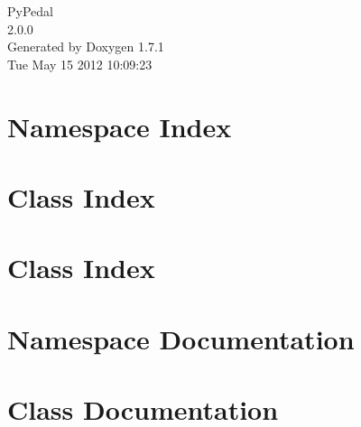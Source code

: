 \documentclass[letterpaper]{book}
\begin{document}
\hypersetup{pageanchor=false}
\begin{titlepage}
\vspace*{7cm}
\begin{center}
{\Large PyPedal \\[1ex]\large 2.0.0 }\\
\vspace*{1cm}
{\large Generated by Doxygen 1.7.1}\\
\vspace*{0.5cm}
{\small Tue May 15 2012 10:09:23}\\
\end{center}
\end{titlepage}
\clearemptydoublepage
{}
\tableofcontents
\clearemptydoublepage
{}
\hypersetup{pageanchor=true}
\chapter{Namespace Index}

\chapter{Class Index}

\chapter{Class Index}

\chapter{Namespace Documentation}












\chapter{Class Documentation}


















\printindex
\end{document}
